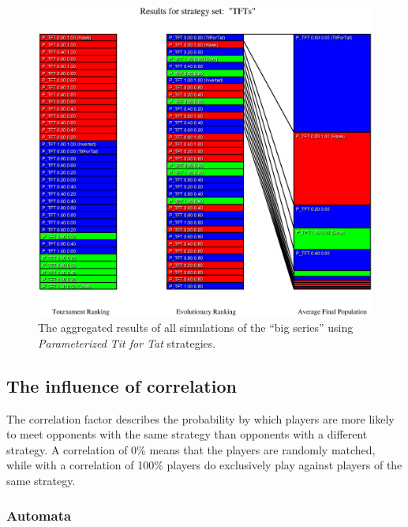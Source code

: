 \begin{figure}
\begin{center}
\includegraphics[width=20cm]{tables/TFTs_overall.eps}
\caption{\label{TFTs_Overall} The aggregated results of all simulations
of the ``big series'' using {\em Parameterized Tit for Tat} strategies.}
\end{center}
\end{figure}


\newpage
\subsection{The influence of correlation}

The correlation factor describes the probability by which players are
more likely to meet opponents with the same strategy than opponents with a
different strategy. A correlation of 0\% means that the players are randomly
matched, while with a correlation of 100\% players do exclusively play
against players of the same strategy.

\subsubsection{Automata}


